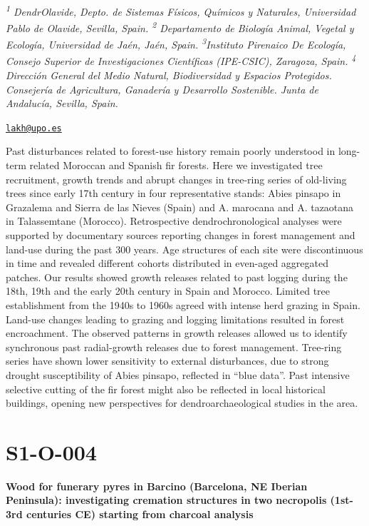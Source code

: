 \documentclass[
]{book}
\begin{document}
\emph{\textsuperscript{1} DendrOlavide, Depto. de Sistemas Físicos, Químicos y Naturales, Universidad Pablo de Olavide, Sevilla, Spain. \textsuperscript{2} Departamento de Biología Animal, Vegetal y Ecología, Universidad de Jaén, Jaén, Spain. \textsuperscript{3}Instituto Pirenaico De Ecología, Consejo Superior de Investigaciones Científicas (IPE-CSIC), Zaragoza, Spain. \textsuperscript{4} Dirección General del Medio Natural, Biodiversidad y Espacios Protegidos. Consejería de Agricultura, Ganadería y Desarrollo Sostenible. Junta de Andalucía, Sevilla, Spain.}

\href{mailto:lakh@upo.es}{\nolinkurl{lakh@upo.es}}

Past disturbances related to forest-use history remain poorly understood in long-term related Moroccan and Spanish fir forests. Here we investigated tree recruitment, growth trends and abrupt changes in tree-ring series of old-living trees since early 17th century in four representative stands: Abies pinsapo in Grazalema and Sierra de las Nieves (Spain) and A. marocana and A. tazaotana in Talassemtane (Morocco). Retrospective dendrochronological analyses were supported by documentary sources reporting changes in forest management and land-use during the past 300 years. Age structures of each site were discontinuous in time and revealed different cohorts distributed in even-aged aggregated patches. Our results showed growth releases related to past logging during the 18th, 19th and the early 20th century in Spain and Morocco. Limited tree establishment from the 1940s to 1960s agreed with intense herd grazing in Spain. Land-use changes leading to grazing and logging limitations resulted in forest encroachment. The observed patterns in growth releases allowed us to identify synchronous past radial-growth releases due to forest management. Tree-ring series have shown lower sensitivity to external disturbances, due to strong drought susceptibility of Abies pinsapo, reflected in ``blue data''. Past intensive selective cutting of the fir forest might also be reflected in local historical buildings, opening new perspectives for dendroarchaeological studies in the area.

\hypertarget{s1-o-004}{%
\section*{S1-O-004}\label{s1-o-004}}

\textbf{Wood for funerary pyres in Barcino (Barcelona, NE Iberian Peninsula): investigating cremation structures in two necropolis (1st-3rd centuries CE) starting from charcoal analysis}
\end{document}

